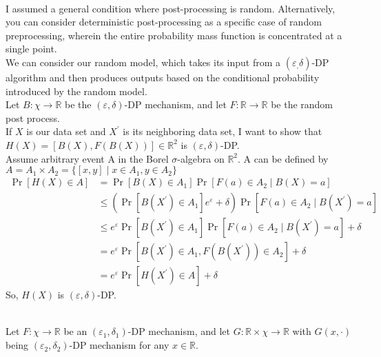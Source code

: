 \documentclass[12pt]{extarticle}
\begin{document}
	\\
I assumed a general condition where post-processing is random. Alternatively, you can consider deterministic post-processing as a specific case of random preprocessing, wherein the entire probability mass function is concentrated at a single point.\\
We can consider our random model, which takes its input from a $(\varepsilon_, \delta)$-DP algorithm and then produces outputs based on the conditional probability introduced by the random model.\\
Let $B: \chi \to \mathbb{R}$ be the $(\varepsilon, \delta)$-DP mechanism, and let $F: \mathbb{R} \to \mathbb{R}$ be the random post process.\\
If $X$ is our data set and $X^{'}$ is its neighboring data set, I want to show that $H(X) = [B(X), F(B(X))] \in \mathbb{R}^2$ is $(\varepsilon, \delta)$-DP.\\
Assume arbitrary event A in the Borel $\sigma$-algebra on $\mathbb{R}^2$. A can be defined by $A = A_1 \times A_2 = \{[x, y] \mid x \in A_1, y \in A_2\}$
\begin{align*}
\Pr[H(X) \in A] &= \Pr[B(X) \in A_1] \Pr[ F(a) \in A_2 \mid B(X) = a] \\
&\leq (\Pr[B(X^{'}) \in A_1]e^{\varepsilon}+\delta)\Pr[ F(a) \in A_2 \mid B(X^{'}) = a]  \\
&\leq e^{\varepsilon} \Pr[B(X^{'}) \in A_1]\Pr[ F(a) \in A_2 \mid B(X^{'}) = a]+\delta\\
&=e^{\varepsilon} \Pr[B(X^{'}) \in A_1, F(B(X^{'})) \in A_2]+\delta\\
& = e^{\varepsilon}\Pr[H(X^{'}) \in A]+\delta
\end{align*}
So, $H(X)$ is $(\varepsilon, \delta)$-DP.
\\	\\
Let $F: \chi \to \mathbb{R}$ be an $(\varepsilon_1, \delta_1)$-DP mechanism, and let $G: \mathbb{R} \times \chi \to \mathbb{R}$ with $G(x, \cdot)$ being $(\varepsilon_2, \delta_2)$-DP mechanism for any $x \in \mathbb{R}$.
\end{document}
